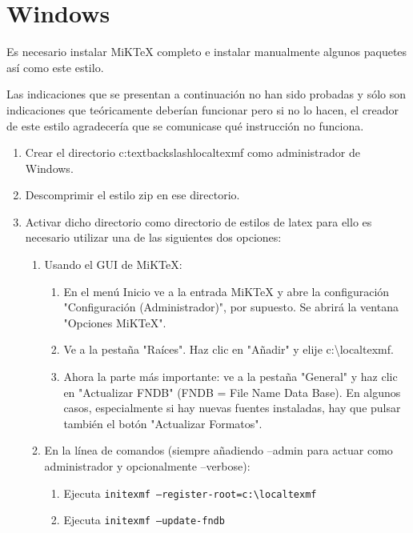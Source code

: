 \section{Windows\textsuperscript{\texttrademark}}

Es necesario instalar MiKTeX completo e instalar manualmente algunos paquetes así como este estilo.

Las indicaciones que se presentan a continuación no han sido probadas y sólo son indicaciones que teóricamente deberían funcionar pero si no lo hacen, el creador de este estilo agradecería que se comunicase qué instrucción no funciona.

\begin{enumerate}
  \item Crear el directorio c:{textbackslash}localtexmf como administrador de Windows.
  \item Descomprimir el estilo zip en ese directorio.
  \item Activar dicho directorio como directorio de estilos de latex para ello es necesario utilizar una de las siguientes dos opciones:
  \begin{enumerate}
    \item Usando el GUI de MiKTeX:
    \begin{enumerate}
      \item En el menú Inicio ve a la entrada MiKTeX y abre la configuración "Configuración (Administrador)", por supuesto. Se abrirá la ventana "Opciones MiKTeX".
      \item Ve a la pestaña "Raíces". Haz clic en "Añadir" y elije c:{\textbackslash}localtexmf.
      \item Ahora la parte más importante: ve a la pestaña "General" y haz clic en "Actualizar FNDB" (FNDB = File Name Data Base). En algunos casos, especialmente si hay nuevas fuentes instaladas, hay que pulsar también el botón "Actualizar Formatos".
    \end{enumerate}
    \item En la línea de comandos (siempre añadiendo --admin para actuar como administrador y opcionalmente --verbose):
    \begin{enumerate}
      \item Ejecuta \texttt{initexmf --register-root=c:{\textbackslash}localtexmf}
      \item Ejecuta \texttt{initexmf --update-fndb}
    \end{enumerate}
  \end{enumerate}
\end{enumerate}

